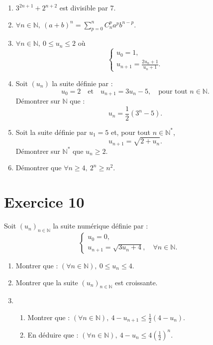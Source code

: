 \documentclass[12pt]{article}
\begin{document}
\begin{enumerate}
    \item \(3^{2n+1} + 2^{n+2}\) est divisible par 7.
    \item \(\forall n \in \mathbb{N}, \ (a+b)^n = \sum_{p=0}^n C_n^p a^p b^{n-p}.\)
    \item \(\forall n \in \mathbb{N}, \ 0 \leq u_n \leq 2\) où
    \[
    \begin{cases}
    u_0 = 1, \\
    u_{n+1} = \frac{2u_n + 1}{u_n + 1}.
    \end{cases}
    \]

    \item Soit \((u_n)\) la suite définie par :
    \[
    u_0 = 2 \quad \text{et} \quad u_{n+1} = 3u_n - 5, \quad \text{pour tout } n \in \mathbb{N}.
    \]
    Démontrer sur \(\mathbb{N}\) que :
    \[
    u_n = \frac{1}{2}(3^n - 5).
    \]

    \item Soit la suite définie par \(u_1 = 5\) et, pour tout \(n \in \mathbb{N}^*\),
    \[
    u_{n+1} = \sqrt{2 + u_n}.
    \]
    Démontrer sur \(\mathbb{N}^*\) que \(u_n \geq 2\).

    \item Démontrer que \(\forall n \geq 4, \ 2^n \geq n^2.\)
\end{enumerate}

\section*{Exercice 10}

Soit \((u_n)_{n \in \mathbb{N}}\) la suite numérique définie par :
\[
\begin{cases}
u_0 = 0, \\
u_{n+1} = \sqrt{3u_n + 4}, \quad \forall n \in \mathbb{N}.
\end{cases}
\]

\begin{enumerate}
    \item Montrer que : \((\forall n \in \mathbb{N}), \ 0 \leq u_n \leq 4\).
    \item Montrer que la suite \((u_n)_{n \in \mathbb{N}}\) est croissante.
    \item 
    \begin{enumerate}
        \item Montrer que : \((\forall n \in \mathbb{N}), \ 4 - u_{n+1} \leq \frac{1}{2}(4 - u_n)\).
        \item En déduire que : \((\forall n \in \mathbb{N}), \ 4 - u_n \leq 4 \left(\frac{1}{2}\right)^n\).
    \end{enumerate}
\end{enumerate}
\end{document}
